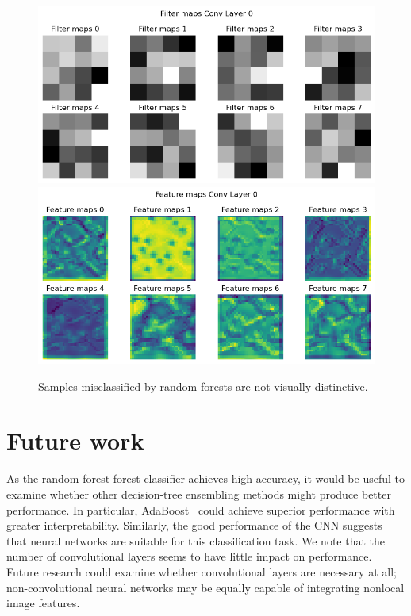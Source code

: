 \documentclass[nofootinbib,pre,superscriptaddress,twocolumn,longbibliography,floatfix]{revtex4-2}
\begin{document}
\begin{figure}[h]
    \centering
    \includegraphics[width=1.0\linewidth]{../figures/D.png}
    \includegraphics[width=1.0\linewidth]{../figures/C.png}
    \caption{Samples misclassified by random forests are not visually distinctive.}
    \label{fig:kernels}
\end{figure}

\section{Future work}
As the random forest forest classifier achieves high accuracy, it would be useful to examine whether other decision-tree ensembling methods might produce better performance.
In particular, AdaBoost~\cite{adaboost} could achieve superior performance with greater interpretability.
Similarly, the good performance of the CNN suggests that neural networks are suitable for this classification task.
We note that the number of convolutional layers seems to have little impact on performance.
Future research could examine whether convolutional layers are necessary at all;
non-convolutional neural networks may be equally capable of integrating nonlocal image features.
\end{document}

